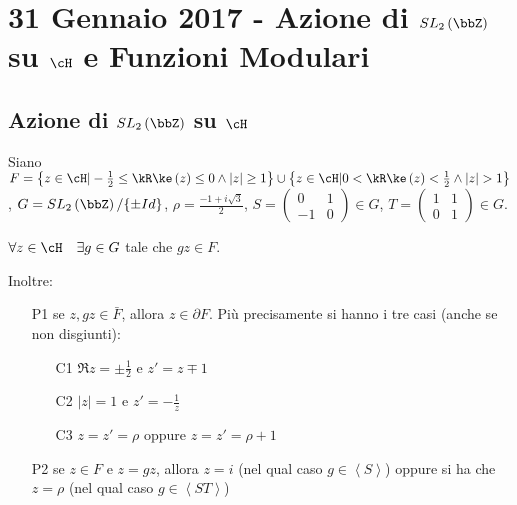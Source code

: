 \newcommand{\squared}[1]{{#1}}
\chapter{31 Gennaio 2017 - Azione di $SL_2 \left( \bbZ \right)$ su $\cH$ e Funzioni Modulari}
\justify

\section{Azione di $SL_2 \left( \bbZ \right)$ su $\cH$}

Siano $F=\left\{z \in \cH | -\frac{1}{2} \leq \Re(z) \leq 0
\wedge |z| \geq 1 \right\} \cup
\left\{z \in \cH | 0 < \Re(z) < \frac{1}{2} \wedge |z| > 1 \right\}$,
$G=SL_2 \left( \bbZ \right)/\{\pm Id\}$,   $\rho=\frac{-1+i\sqrt{3}}{2}$,
$S=\left( \begin{array}{cc} 0 & 1 \\ -1 & 0 \end{array} \right) \in G$,
$T=\left( \begin{array}{cc} 1 & 1 \\ 0 & 1 \end{array} \right) \in G$.

\begin{teorema}
$\forall z \in \cH \quad \exists g \in G$ tale che $gz \in F$.

Inoltre:
\begin{itemize}
\item[P1] se $z,gz \in \bar{F}$, allora $z \in \partial F$.
  Più precisamente si hanno i tre casi (anche se non disgiunti):
  \begin{enumerate}
  \item[C1] $\Re z = \pm \frac{1}{2}$ e $z' = z \mp 1$
  \item[C2] $|z| = 1$ e $z' = - \frac{1}{z}$
  \item[C3] $z = z' = \rho$ oppure $z = z' = \rho + 1$
  \end{enumerate}
\item[P2] se $z \in F$ e $z=gz$,
  allora $z=i$ (nel qual caso $g \in \left\langle S \right\rangle$) oppure si ha che
  $z= \rho$ (nel qual caso $g \in \left\langle ST \right\rangle$)
\end{itemize}
\end{teorema}

